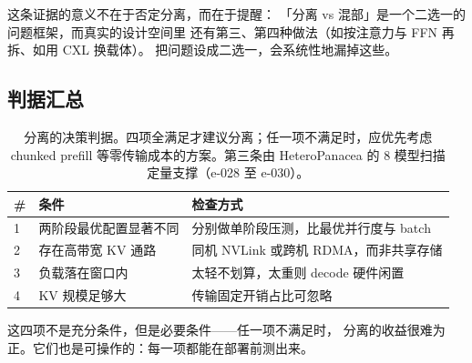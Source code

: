 这条证据的意义不在于否定分离，而在于提醒：
「分离 vs 混部」是一个二选一的问题框架，而真实的设计空间里
还有第三、第四种做法（如按注意力与 FFN 再拆、如用 CXL 换载体）。
把问题设成二选一，会系统性地漏掉这些。

\subsection{判据汇总}

\begin{table}[t]
\centering
\caption{分离的决策判据。四项全满足才建议分离；任一项不满足时，应优先考虑 chunked prefill
等零传输成本的方案。第三条由 HeteroPanacea 的 8 模型扫描定量支撑（e-028 至 e-030）。}
\label{tab:criteria}
\small
\begin{tabular}{@{}p{0.35cm}p{3.0cm}p{2.5cm}@{}}
\toprule
\# & 条件 & 检查方式 \\
\midrule
1 & 两阶段最优配置显著不同 & 分别做单阶段压测，比最优并行度与 batch \\
2 & 存在高带宽 KV 通路 & 同机 NVLink 或跨机 RDMA，而非共享存储 \\
3 & 负载落在窗口内 & 太轻不划算，太重则 decode 硬件闲置 \\
4 & KV 规模足够大 & 传输固定开销占比可忽略 \\
\bottomrule
\end{tabular}
\end{table}

这四项不是充分条件，但是必要条件——任一项不满足时，
分离的收益很难为正。它们也是可操作的：每一项都能在部署前测出来。
